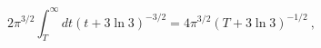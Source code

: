 \begin{equation}
2\pi^{3/2} \int_T^\infty
dt (t+ 3\ln 3)^{-3/2} =
4 \pi^{3/2}
(T + 3\ln 3)^{-1/2}\ ,
\end{equation}

